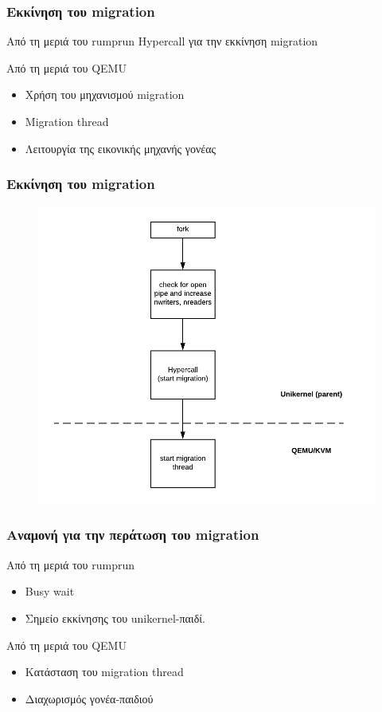 \documentclass[red,slidestop,notes,compress,mathserif]{beamer}
\begin{document}
\begin{frame}
\frametitle{Εκκίνηση του migration}
\begin{block}{Από τη μεριά του rumprun}
Hypercall για την εκκίνηση migration 
\end{block}
\begin{block}{Από τη μεριά του QEMU}
\begin{itemize}
\item Χρήση του μηχανισμού migration
\item Migration thread
\item Λειτουργία της εικονικής μηχανής γονέας
\end{itemize}
\end{block}
\end{frame}

\begin{frame}
\frametitle{Εκκίνηση του migration}
\begin{figure}
\center
\includegraphics[scale=0.57]{figures/fork_stage1.png}
\end{figure}
\end{frame}

\begin{frame}
\frametitle{Αναμονή για την περάτωση του migration}
\begin{block}{Από τη μεριά του rumprun}
\begin{itemize}
\item Busy wait 
\item Σημείο εκκίνησης του unikernel-παιδί.
\end{itemize}
\end{block}
\begin{block}{Από τη μεριά του QEMU}
\begin{itemize}
\item Κατάσταση του migration thread
\item Διαχωρισμός γονέα-παιδιού
\end{itemize}
\end{block}
\end{frame}
\end{document}

